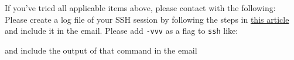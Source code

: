 \begin{enumerate}
If you've tried all applicable items above, please contact \hpcinfo with the following:
\ifwindows
Please create a log file of your SSH session by following the steps
in \href{https://my.kualo.com/knowledgebase/?kbcat=0&article=888}{this article}
and include it in the email.
\else
Please add \verb|-vvv| as a flag to \verb|ssh| like:

\begin{prompt}
\end{prompt}

and include the output of that command in the email

\fi

\end{enumerate}
